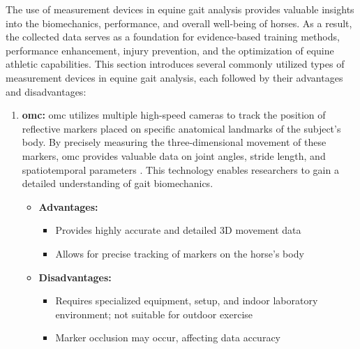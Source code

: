 The use of measurement devices in equine gait analysis provides valuable insights into the biomechanics, performance, and overall well-being of horses. As a result, the collected data serves as a foundation for evidence-based training methods, performance enhancement, injury prevention, and the optimization of equine athletic capabilities. This section introduces several commonly utilized types of measurement devices in equine gait analysis, each followed by their advantages and disadvantages:
\begin{enumerate}
\item \textbf{\gls{omc}:} \gls{omc} utilizes multiple high-speed cameras to track the position of reflective markers placed on specific anatomical landmarks of the subject's body. By precisely measuring the three-dimensional movement of these markers, \gls{omc} provides valuable data on joint angles, stride length, and spatiotemporal parameters \cite{higginson}. This technology enables researchers to gain a detailed understanding of gait biomechanics.
\vspace{1cm}
\begin{itemize}
\item[] \textbf{\small Advantages:}
\begin{itemize}
\item Provides highly accurate and detailed 3D movement data
\item Allows for precise tracking of markers on the horse's body
\end{itemize}
\item[] \textbf{\small Disadvantages:}
\begin{itemize}
\item Requires specialized equipment, setup, and indoor laboratory environment; not suitable for outdoor exercise \cite{darbandi_2021_using}
\item Marker occlusion may occur, affecting data accuracy \cite{occulusion}
\end{itemize}
\end{itemize}


\end{enumerate}
